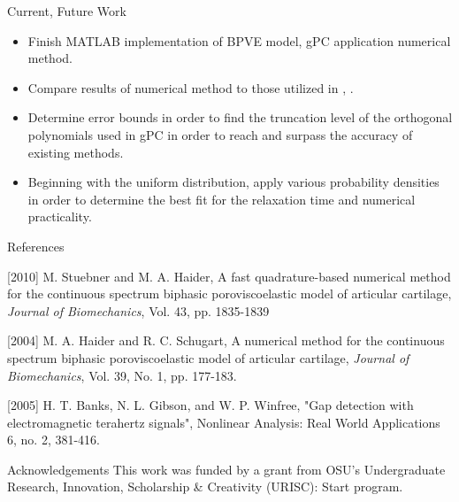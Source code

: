 \documentclass[final]{beamer} %
\begin{document}
\begin{frame}[t]
\begin{columns}[t]
\begin{column}{0.28\paperwidth}
\begin{block}{Current, Future Work}
\begin{itemize}
\item
Finish MATLAB implementation of BPVE model, gPC application numerical method.
\item
Compare results of numerical method to those utilized in \cite{stuebner}, \cite{schugart}.
\item
Determine error bounds in order to find the truncation level of the orthogonal
polynomials used in gPC in order to reach and surpass the accuracy of existing methods.
\item
Beginning with the uniform distribution, apply various probability densities in order
to determine the best fit for the relaxation time and numerical practicality.
\end{itemize}
\end{block}

\begin{block}{References}
\begin{thebibliography}{7}

{\small
{}[2010] M. Stuebner and M. A. Haider, A fast quadrature-based numerical method for the continuous spectrum biphasic poroviscoelastic model of articular cartilage, {\em Journal of Biomechanics}, Vol. 43, pp. 1835-1839

[2004] M. A. Haider and R. C. Schugart, A numerical method for the continuous spectrum biphasic poroviscoelastic model of articular cartilage, {\em Journal of Biomechanics}, Vol. 39, No. 1, pp. 177-183.

[2005] H. T. Banks, N. L. Gibson, and W. P. Winfree, "Gap detection with electromagnetic terahertz signals", Nonlinear Analysis: Real World Applications 6, no. 2, 381-416.
}
\end{thebibliography}
\end{block}

\begin{block}{Acknowledgements}
This work was funded by a grant from OSU's Undergraduate Research, Innovation, Scholarship \& Creativity (URISC): Start program.
\end{block}
\end{column}
\end{columns}

\end{frame}
\end{document}
